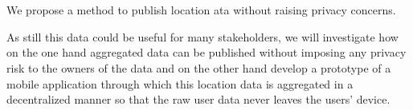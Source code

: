 \chapter{\abstractname}

We propose a method to publish location ata without raising privacy concerns.


As still this data could be useful for many stakeholders, we will investigate how on the one hand aggregated data can be published without imposing any privacy risk to the owners of the data and on the other hand develop a prototype of a mobile application through which this location data is aggregated in a decentralized manner so that the raw user data never leaves the users' device.
